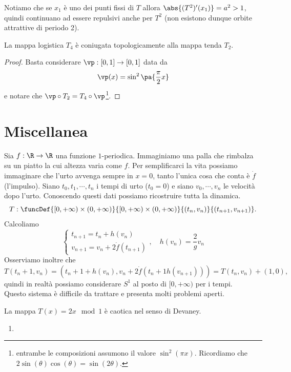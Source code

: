 \begin{example}
\begin{itemize}
Notiamo che se $x_1$ \`e uno dei punti fissi di $T$ allora $\abs{(T^2)'(x_1)}=a^2>1$, quindi continuano ad essere repulsivi anche per $T^2$ (non esistono dunque orbite attrattive di periodo 2).
\end{itemize}
\setlength{\leftmargini}{0.5cm}
\end{example}
    
\begin{remark}
La mappa logistica $T_4$ \`e coniugata topologicamente alla mappa tenda $T_2$.
\end{remark}
\begin{proof}
Basta considerare $\vp:[0,1]\to [0,1]$ data da
\[\vp(x)=\sin^2\pa{\frac\pi2x}\]
e notare che $\vp\circ T_2=T_4\circ \vp$\footnote{entrambe le composizioni assumono il valore $\sin^2(\pi x)$. Ricordiamo che $2\sin(\theta)\cos(\theta)=\sin(2\theta)$.}.
\end{proof}

\section{Miscellanea}
\begin{example}
Sia $f:\R\to \R$ una funzione $1$-periodica. Immaginiamo una palla che rimbalza su un piatto la cui altezza varia come $f$. Per semplificarci la vita possiamo immaginare che l'urto avvenga sempre in $x=0$, tanto l'unica cosa che conta \`e $\dot f$ (l'impulso). Siano $t_0,t_1,\cdots,t_n$ i tempi di urto ($t_0=0$) e siano $v_0,\cdots,v_n$ le velocit\`a dopo l'urto. Conoscendo questi dati possiamo ricostruire tutta la dinamica.
\[T:\funcDef{[0,+\infty)\times (0,+\infty)}{[0,+\infty)\times (0,+\infty)}{(t_{n},v_n)}{(t_{n+1},v_{n+1})}.\]
Calcoliamo
\[\begin{cases}
t_{n+1}=t_n+h(v_n)\\
v_{n+1}=v_n+2\dot f(t_{n+1})
\end{cases},\quad h(v_n)=\frac 2gv_n\]
Osserviamo inoltre che
\[T(t_n+1,v_n)=(t_n+1+h(v_n), v_n+2\dot f(t_n+1 h(v_{n+1})))=T(t_n,v_n)+(1,0),\]
quindi in realt\`a possiamo considerare $S^1$ al posto di $[0,+\infty)$ per i tempi.\\
Questo sistema \`e difficile da trattare e presenta molti problemi aperti.
\end{example}


\begin{example}
La mappa $T(x)=2x\mod 1$ \`e caotica nel senso di Devaney.
\begin{enumerate}
\item 
\end{enumerate}
\end{example}

